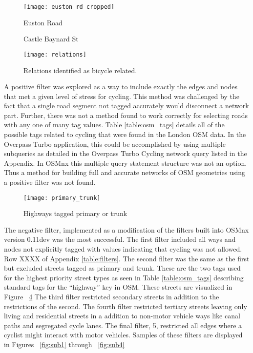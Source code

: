\begin{figure}
\centering
\texttt{[image: euston\_rd\_cropped]}
\caption{Euston Road}
\label{fig:euston}
\end{figure}

\begin{figure}
  \centering
  \caption{Castle Baynard St}
  \label{fig:baynard}
\end{figure}

\begin{figure}
\centering
\texttt{[image: relations]}
\caption{Relations identified as bicycle related.}
\label{fig:bicycle_relation}
\end{figure}

A positive filter was explored as a way to include exactly the edges and nodes that met a given level of stress for cycling. This method was challenged by the fact that a single road segment not tagged accurately would disconnect a network part. Further, there was not a method found to work correctly for selecting roads with any one of many tag values.  Table \ref{table:osm_tags} details all of the possible tags related to cycling that were found in the London OSM data.  In the Overpass Turbo application, this could be accomplished by using multiple subqueries as detailed in the Overpass Turbo Cycling network query listed in the Appendix. In OSMnx this multiple query statement structure was not an option. Thus a method for building full and accurate networks of OSM geometries using a positive filter was not found. 




\begin{figure}
\centering
\texttt{[image: primary\_trunk]}
\caption{Highways tagged primary or trunk}
\label{fig:primary_trunk}
\end{figure}

The negative filter, implemented as a modification of the filters built into OSMnx version 0.11dev was the most successful. The first filter included all ways and nodes not explicitly tagged with values indicating that cycling was not allowed. Row XXXX of Appendix \ref{table:filters}. The second filter was the same as the first but excluded streets tagged as primary and trunk. These are the two tags used for the highest priority street types as seen in Table \ref{table:osm_tags} describing standard tags for the ``highway'' key in OSM. These streets are visualized in Figure ~\ref{fig:primary_trunk} The third filter restricted secondary streets in addition to the restrictions of the second. The fourth filter restricted tertiary streets leaving only living and residential streets in a addition to non-motor vehicle ways like canal paths and segregated cycle lanes. The final filter, 5, restricted all edges where a cyclist might interact with motor vehicles. Samples of these filters are displayed in Figures ~\ref{fig:sub1} through ~\ref{fig:sub4}

